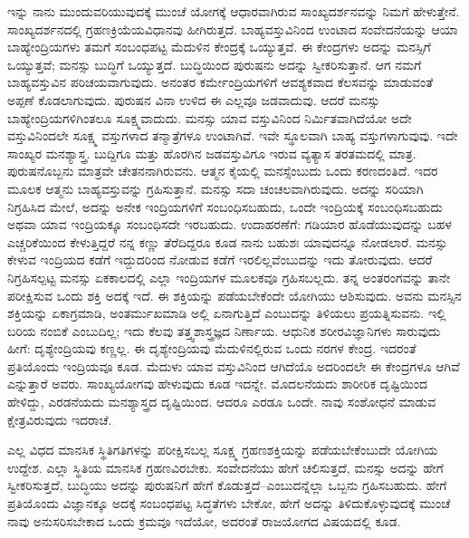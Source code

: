 ಇನ್ನು ನಾನು ಮುಂದುವರಿಯುವುದಕ್ಕೆ ಮುಂಚೆ ಯೋಗಕ್ಕೆ ಆಧಾರವಾಗಿರುವ ಸಾಂಖ್ಯದರ್ಶನವನ್ನು ನಿಮಗೆ ಹೇಳುತ್ತೇನೆ. ಸಾಂಖ್ಯದರ್ಶನದಲ್ಲಿ ಗ್ರಹಣಕ್ರಿಯೆಯ\break ವಿಧಾನವು ಹೀಗಿರುತ್ತದೆ. ಬಾಹ್ಯವಸ್ತುವಿನಿಂದ ಉಂಟಾದ ಸಂವೇದನೆಯನ್ನು ಆಯಾ ಬಾಹ್ಯೇಂದ್ರಿಯಗಳು ತಮಗೆ ಸಂಬಂಧಪಟ್ಟ ಮೆದುಳಿನ ಕೇಂದ್ರಕ್ಕೆ ಒಯ್ಯುತ್ತವೆ. ಈ ಕೇಂದ್ರಗಳು ಅದನ್ನು ಮನಸ್ಸಿಗೆ ಒಯ್ಯುತ್ತವೆ; ಮನಸ್ಸು ಬುದ್ಧಿಗೆ ಒಯ್ಯುತ್ತದೆ. ಬುದ್ಧಿಯಿಂದ ಪುರುಷನು ಅದನ್ನು ಸ್ವೀಕರಿಸುತ್ತಾನೆ. ಆಗ ನಮಗೆ ಬಾಹ್ಯವಸ್ತುವಿನ ಪರಿಚಯವಾಗುವುದು. ಅನಂತರ ಕರ್ಮೇಂದ್ರಿಯಗಳಿಗೆ ಆವಶ್ಯಕವಾದ ಕೆಲಸವನ್ನು ಮಾಡುವಂತೆ ಅಪ್ಪಣೆ ಕೊಡಲಾಗುವುದು. ಪುರುಷನ ವಿನಾ ಉಳಿದ ಈ ಎಲ್ಲವೂ ಜಡವಾದುವು. ಆದರೆ ಮನಸ್ಸು ಬಾಹ್ಯೇಂದ್ರಿಯಗಳಿಗಿಂತಲೂ ಸೂಕ್ಷ್ಮವಾದುದು. ಮನಸ್ಸು ಯಾವ ವಸ್ತುವಿನಿಂದ ನಿರ್ಮಿತವಾಗಿದೆಯೋ ಅದೇ ವಸ್ತುವಿನಿಂದಲೇ ಸೂಕ್ಷ್ಮ ವಸ್ತುಗಳಾದ ತನ್ಮಾತ್ರೆಗಳೂ ಉಂಟಾಗಿವೆ. ಇವೇ ಸ್ಥೂಲವಾಗಿ ಬಾಹ್ಯ ವಸ್ತುಗಳಾಗುವುವು. ಇದೇ ಸಾಂಖ್ಯರ ಮನಶ್ಯಾಸ್ತ್ರ. ಬುದ್ದಿಗೂ ಮತ್ತು ಹೊರಗಿನ ಜಡವಸ್ತುವಿಗೂ ಇರುವ ವ್ಯತ್ಯಾಸ ತರತಮದಲ್ಲಿ ಮಾತ್ರ. ಪುರುಷನೊಬ್ಬನು ಮಾತ್ರವೇ ಚೇತನನಾಗಿರುವನು. ಆತ್ಮನ ಕೈಯಲ್ಲಿ ಮನಸ್ಸೆಂಬುದು ಒಂದು ಕರಣದಂತಿದೆ. ಇದರ ಮೂಲಕ ಆತ್ಮನು ಬಾಹ್ಯವಸ್ತುವನ್ನು ಗ್ರಹಿಸುತ್ತಾನೆ. ಮನಸ್ಸು ಸದಾ ಚಂಚಲವಾಗಿರುವುದು. ಅದನ್ನು ಸರಿಯಾಗಿ ನಿಗ್ರಹಿಸಿದ ಮೇಲೆ, ಅದನ್ನು ಅನೇಕ ಇಂದ್ರಿಯಗಳಿಗೆ ಸಂಬಂಧಿಸಬಹುದು, ಒಂದೇ ಇಂದ್ರಿಯಕ್ಕೆ ಸಂಬಂಧಿಸಬಹುದು ಅಥವಾ ಯಾವ ಇಂದ್ರಿಯಕ್ಕೂ ಸಂಬಂಧಿಸದೇ ಇರಬಹುದು. ಉದಾಹರಣೆಗೆ: ಗಡಿಯಾರ ಹೊಡೆಯುವುದನ್ನು ಬಹಳ ಎಚ್ಚರಿಕೆಯಿಂದ ಕೇಳುತ್ತಿದ್ದರೆ ನನ್ನ ಕಣ್ಣು ತೆರೆದಿದ್ದರೂ ಕೂಡ ನಾನು ಬಹುಶಃ ಯಾವುದನ್ನೂ ನೋಡಲಾರೆ. ಮನಸ್ಸು ಕೇಳುವ ಇಂದ್ರಿಯದ ಕಡೆಗೆ ಇದ್ದುದರಿಂದ ನೋಡುವ ಕಡೆಗೆ ಇರಲಿಲ್ಲವೆಂಬುದನ್ನು ಇದು ತೋರುವುದು. ಆದರೆ ನಿಗ್ರಹಿಸಲ್ಪಟ್ಟ ಮನಸ್ಸು ಏಕಕಾಲದಲ್ಲಿ ಎಲ್ಲಾ ಇಂದ್ರಿಯಗಳ ಮೂಲಕವೂ ಗ್ರಹಿಸಬಲ್ಲದು. ತನ್ನ ಅಂತರಂಗವನ್ನು ತಾನೇ ಪರೀಕ್ಷಿಸುವ ಒಂದು ಶಕ್ತಿ ಅದಕ್ಕೆ ಇದೆ. ಈ ಶಕ್ತಿಯನ್ನು ಪಡೆಯಬೇಕೆಂದೇ ಯೋಗಿಯು ಆಶಿಸುವುದು. ಅವನು ಮನಸ್ಸಿನ ಶಕ್ತಿಯನ್ನು ಏಕಾಗ್ರಮಾಡಿ, ಅಂತರ್ಮುಖಮಾಡಿ ಅಲ್ಲಿ ಏನಾಗುತ್ತಿದೆ ಎಂಬುದನ್ನು ತಿಳಿಯಲು ಪ್ರಯತ್ನಿಸುವನು. ಇಲ್ಲಿ ಬರಿಯ ನಂಬಿಕೆ ಎಂಬುದಿಲ್ಲ; ಇದು ಕೆಲವು ತತ್ತ್ವಶಾಸ್ತ್ರಜ್ಞದ ನಿರ್ಣಾಯ. ಆಧುನಿಕ ಶರೀರವಿಜ್ಞಾನಿಗಳು ಸಾರುವುದು ಹೀಗೆ: ದೃಶ್ಯೇಂದ್ರಿಯವು ಕಣ್ಣಲ್ಲ. ಈ ದೃಶ್ಯೇಂದ್ರಿಯವು ಮೆದುಳಿನಲ್ಲಿರುವ ಒಂದು ನರಗಳ ಕೇಂದ್ರ. ಇದರಂತೆ ಪ್ರತಿಯೊಂದು ಇಂದ್ರಿಯವೂ ಕೂಡ. ಮೆದುಳು ಯಾವ ವಸ್ತುವಿನಿಂದ ಆಗಿದೆಯೊ ಅದರಿಂದಲೇ ಈ ಕೇಂದ್ರಗಳೂ ಆಗಿವೆ ಎನ್ನುತ್ತಾರೆ ಅವರು. ಸಾಂಖ್ಯಯೋಗವು ಹೇಳುವುದು ಕೂಡ ಇದನ್ನೇ. ಮೊದಲನೆಯದು ಶಾರೀರಿಕ ದೃಷ್ಟಿಯಿಂದ ಹೇಳಿದ್ದು, ಎರಡನೆಯದು ಮನಶ್ಯಾಸ್ತ್ರದ ದೃಷ್ಟಿಯಿಂದ. ಆದರೂ ಎರಡೂ ಒಂದೇ. ನಾವು ಸಂಶೋಧನೆ ಮಾಡುವ ಕ್ಷೇತ್ರವಿರುವುದು ಇದರಾಚೆ. 

ಎಲ್ಲ ವಿಧದ ಮಾನಸಿಕ ಸ್ಥಿತಿಗತಿಗಳನ್ನು ಪರೀಕ್ಷಿಸಬಲ್ಲ ಸೂಕ್ಷ್ಮ ಗ್ರಹಣಶಕ್ತಿಯನ್ನು ಪಡೆಯಬೇಕೆಂಬುದೇ ಯೋಗಿಯ ಉದ್ದೇಶ. ಎಲ್ಲಾ ಸ್ಥಿತಿಯ ಮಾನಸಿಕ ಗ್ರಹಣವಿರಬೇಕು. ಸಂವೇದನೆಯು ಹೇಗೆ ಚಲಿಸುತ್ತದೆ, ಮನಸ್ಸು ಅದನ್ನು ಹೇಗೆ ಸ್ವೀಕರಿಸುತ್ತದೆ, ಬುದ್ಧಿಯು ಅದನ್ನು ಪುರುಷನಿಗೆ ಹೇಗೆ ಕೊಡುತ್ತದೆ–ಎಂಬುದನ್ನೆಲ್ಲಾ ಒಬ್ಬನು ಗ್ರಹಿಸಬಹುದು. ಹೇಗೆ ಪ್ರತಿಯೊಂದು ವಿಜ್ಞಾನಕ್ಕೂ ಅದಕ್ಕೆ ಸಂಬಂಧಪಟ್ಟ ಸಿದ್ಧತೆಗಳು ಬೇಕೋ, ಹೇಗೆ ಅದನ್ನು ತಿಳಿದುಕೊಳ್ಳುವುದಕ್ಕೆ ಮುಂಚೆ ನಾವು ಅನುಸರಿಸಬೇಕಾದ ಒಂದು ಕ್ರಮವೂ ಇದೆಯೋ, ಅದರಂತೆ ರಾಜಯೋಗದ ವಿಷಯದಲ್ಲಿ ಕೂಡ. 


